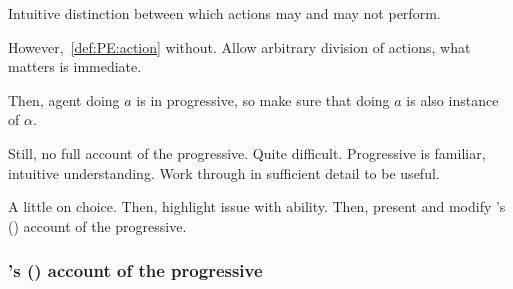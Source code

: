 \begin{note}
  Intuitive distinction between which actions may and may not perform.

  However,~\ref{def:PE:action} without.
  Allow arbitrary division of actions, what matters is immediate.

  Then, agent doing \(a\) is in progressive, so make sure that doing \(a\) is also instance of \(\alpha\).
\end{note}


\begin{note}
  Still, no full account of the progressive.
  Quite difficult.
  Progressive is familiar, intuitive understanding.
  Work through in sufficient detail to be useful.

  A little on choice.
  Then, highlight issue with ability.
  Then, present and modify \citeauthor{Landman:1992wh}'s (\citeyear{Landman:1992wh}) account of the progressive.
\end{note}


\subsubsection{\citeauthor{Landman:1992wh}'s (\citeyear{Landman:1992wh}) account of the progressive}
\label{cha:sec:fcs-def:progressive-landman}
\nocite{Portner:1998um}
\nocite{Engelberg:1999vi}

